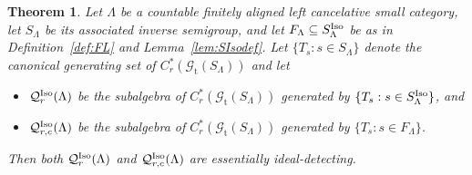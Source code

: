 \documentclass[12pt]{amsart}
\newtheorem{thm}{Theorem}[section]
\theoremstyle{definition}
\theoremstyle{remark}
\numberwithin{equation}{section}
\newcommand{\Q}{\mathcal{Q}}
\renewcommand{\L}{\Lambda}
\newcommand{\gt}{\mathcal{G}_{\text{t}}}
\newcommand{\Iso}{\textup{Iso}}
\begin{document}
	\begin{thm}\label{thm:main_theorem}
		Let $\L$ be a countable finitely aligned left cancelative small category, let $S_\L$ be its associated inverse semigroup, and let $F_\L\subseteq S_\L^\Iso$ be as in Definition~\ref{def:FL} and Lemma~\ref{lem:SIsodef}. Let $\{T_s:s\in S_\L\}$ denote the canonical generating set of $C^*_r(\gt(S_\L))$ and let 
		\begin{itemize}
			\item $\Q_{r}^\Iso(\L)$ be the subalgebra of $C^*_r(\gt(S_\L))$ generated by $\{T_s:s\in S^\Iso_\L\}$, and
			\item $\Q^\Iso_{r,c}(\L)$ be the subalgebra of $C^*_r(\gt(S_\L))$ generated by $\{T_s:s\in F_\L\}$.
		\end{itemize}
		Then both $\Q_{r}^\Iso(\L)$ and $\Q^\Iso_{r,c}(\L)$ are essentially ideal-detecting.
	\end{thm}
	
\end{document}
